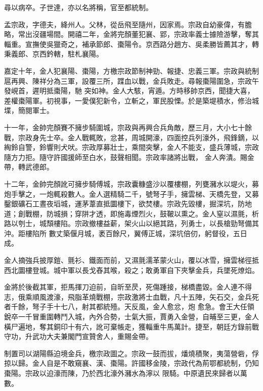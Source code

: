 \begin{pinyinscope}
 尋以病卒。子世達，亦以名將稱，官至都統制。



 孟宗政，字德夫，絳州人。父林，從岳飛至隨州，因家焉。宗政自幼豪偉，有膽略，常出沒疆場間。開禧二年，金將完顏董犯襄、郢，宗政率義士據險游擊，奪其輜重。宣撫使吳獵奇之，補承節郎、棗陽令。京西路分趙方、吳柔勝皆薦其才，轉秉義郎、京西鈐轄，駐札襄陽。



 嘉定十年，金人犯襄陽、棗陽，方檄宗政節制神勁、報捷、忠義三軍。宗政與統制扈再興、陳祥分為三軍，設覆三所，蹀血以戰，金兵敗走。尋報棗陽圍急，宗政午發峴首，遲明抵棗陽，馳
 突如神。金人大駭，宵遁。方時移帥京西，聞捷大喜，差權棗陽軍。初視事，一愛僕犯新令，立斬之，軍民股慄。於是築堤積水，修治城堞，簡閱軍士。



 十一年，金帥完顏賽不擁步騎圍城，宗政與再興合兵角敵，歷三月，大小七十餘戰，宗政身先士卒。金人戰輒敗，忿甚，周城開濠，四面控兵列濠外，飛鋒鏑，以綯鈴自警，鈴響則犬吠。宗政厚募壯士，乘間突擊，金人不能支，盛兵薄城，宗政隨方力拒。隨守許國援師至白水，鼓聲相聞。宗政率諸將出戰，
 金人奔潰。賜金帶，轉武德郎。



 十二年，金帥完顏訛可擁步騎傅城，宗政囊糠盛沙以覆樓棚，列甕瀦水以堤火，募炮手擊之，一炮輒殺數人。金人選精騎二千，號弩子手，擁雲梯、天橋先登，又募鑿銀礦石工晝夜塪城，運茅葦直抵圜樓下，欲焚樓。宗政先毀樓，掘深坑，防地道；創戰棚，防城損；穿阱才透，即施毒煙烈火，鼓鞁以熏之。金人窒以濕氈，析路以刳士，城頹樓陷。宗政撤樓益薪，架火山以絕其路，列勇士，以長槍勁弩備其沖。距樓陷所
 數丈築偃月城，袤百餘尺，翼傅正城，深坑倍仞，躬督役，五日成。



 金人摘強兵披厚鎧、氈衫、鐵面而前，又濕氈濡革蒙火山，覆以冰雪，擁雲梯徑抵西北圜樓登城。城中軍以長戈舂其喉，殺之；敢勇軍自下夾擊金兵，兵墜死燎焰。



 金將於後截其軍，拒馬揮刀迫前，自昕至昃，死傷踵接，梯橋盡毀。金人連不得志，俄乘順風渡濠，飛脂革燒戰棚，宗政激將士血戰，凡十五陣，矢石交，金兵死者千餘，弩子手十七八，射其都統殪。天反風，金人愈忿，炮
 愈急。會王大任領銳卒一千冒重圍轉鬥入城，內外合勢，士氣大振，賈勇入金營，自晡至三更，金人橫尸遍地，奪其銅印十有六，訛可棄帳走，獲輜重牛馬萬計。捷至，朝廷方錄前戰守功，升武功大夫兼閣門宣贊舍人，重賜金帶。



 制置司以湖陽縣迫境金兵，檄宗政圖之。宗政一鼓而拔，燔燒積聚，夷蕩營砦，俘掠以歸。金人自是不敢窺襄、漢、棗陽。許國移金陵，宗政代為荊鄂都統制，仍知棗陽。宗政以迫濠而陳，乃於西北濠外瀦水為濘以
 限騎。中原遺民來歸者以萬數。




\end{pinyinscope}
